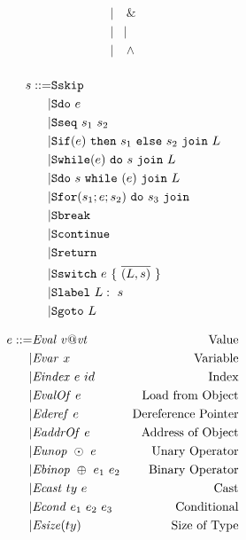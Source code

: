\documentclass[acmsmall,review,anonymous]{acmart}\settopmatter{printfolios=true,printccs=false,printacmref=false}
\begin{document}
\begin{figure}
\begin{subfigure}[t]{0.3\textwidth}
\begin{minipage}[t]{0.25\textwidth}
\[\begin{aligned}
      | & ~ \& \\
      | & \mid \\
      | & ~ \wedge \\
      \end{aligned}\]
    \end{minipage}
    \[\begin{aligned}
    s ::= & \mathtt{Sskip} \\
    | & \mathtt{Sdo} ~ e \\
    | & \mathtt{Sseq} ~ s_1 ~ s_2 \\
    | & \mathtt{Sif}(e) ~ \mathtt{then} ~ s_1 ~ \mathtt{else} ~ s_2 ~ \mathtt{join} ~ L \\
    | & \mathtt{Swhile}(e) ~ \mathtt{do} ~ s ~ \mathtt{join} ~ L \\
    | & \mathtt{Sdo} ~ s ~ \mathtt{while} ~ (e) ~ \mathtt{join} ~ L \\
    | & \mathtt{Sfor}(s_1; e; s_2) ~ \mathtt{do} ~ s_3 ~ \mathtt{join} ~ \\
    | & \mathtt{Sbreak} \\
    | & \mathtt{Scontinue} \\
    | & \mathtt{Sreturn} \\
    | & \mathtt{Sswitch} ~ e ~ \{ ~ \overline{(L,s)} ~ \} \\
    | & \mathtt{Slabel} ~ L: ~ s \\
    | & \mathtt{Sgoto} ~ L \\    
    \end{aligned}\]
  \end{subfigure}
  \begin{subfigure}[t]{0.69\textwidth}
    \[\begin{aligned}
    \expr ::= & \val{v}{\vt} & \textnormal{Value} \\
    | & \var{x} & \textnormal{Variable} \\
    | & \eindex{\expr}{id} & \textnormal{Index} \\
    | & \valof{\expr} & \textnormal{Load from Object} \\
    | & \deref{\expr} & \textnormal{Dereference Pointer} \\
    | & \addrof{\expr} & \textnormal{Address of Object} \\
    | & \unop{\odot}{\expr} & \textnormal{Unary Operator} \\
    | & \binop{\oplus}{\expr_1}{\expr_2} & \textnormal{Binary Operator} \\
    | & \cast{\expr}{ty} & \textnormal{Cast} \\
    | & \condition{\expr_1}{\expr_2}{\expr_3} & \textnormal{Conditional} \\
    | & \sizeof{ty} & \textnormal{Size of Type} \\

\end{aligned}\]
\end{subfigure}
\end{figure}
\end{document}
